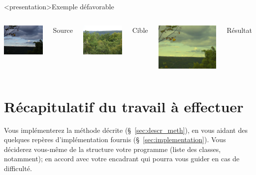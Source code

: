 \begin{frame}<presentation>{Exemple défavorable}
  \begin{columns}
    \column{6cm}
    \centering
    \includegraphics[width=4cm]{P8170066}

    Source

    \vspace{2ex}
    \includegraphics[width=4cm]{P8170082}

    Cible

    \column{6cm}
    \centering
    \includegraphics[width=6cm]{srcP8170066tgtP8170082}

    Résultat
  \end{columns}
\end{frame}


\section{Récapitulatif du travail à effectuer}
\label{sec:recapitulatif}

Vous implémenterez la méthode décrite (§~\ref{sec:descr_meth}), en vous aidant
des quelques repères d'implémentation fournis (§~\ref{sec:implementation}).
Vous déciderez vous-même de la structure votre programme (liste des classes,
notamment); en accord avec votre encadrant qui pourra vous guider en cas de
difficulté.

